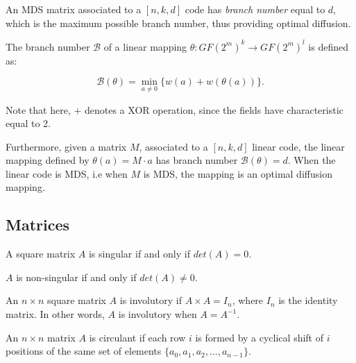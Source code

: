An MDS matrix associated to a $[n, k, d]$ code has \emph{branch number} equal to $d$, which is the maximum possible branch number, thus providing optimal diffusion.

\begin{definition}\label{def:branch-number}
The branch number $\mathcal{B}$ of a linear mapping $\theta: GF(2^m)^k \rightarrow GF(2^m)^l$ is defined as:

$$\mathcal{B}(\theta) = \min_{a\neq0}\{w(a) + w(\theta(a))\}.$$

Note that here, $+$ denotes a XOR operation, since the fields have characteristic equal to 2.

Furthermore, given a matrix $M$, associated to a $[n, k, d]$ linear code, the linear mapping defined by $\theta(a) = M \cdot a$ has branch number $\mathcal{B}(\theta) = d$. When the linear code is MDS, i.e when $M$ is MDS, the mapping is an optimal diffusion mapping.
\end{definition}

\subsection{Matrices}


\begin{definition}
A square matrix $A$ is singular if and only if $det(A) = 0$.
\end{definition}

\begin{definition}
$A$ is non-singular if and only if $det(A) \neq 0$.
\end{definition}

\begin{definition}
An $n \times n$ square matrix $A$ is involutory if $A \times A = I_n$, where $I_n$ is the identity matrix. In other words, $A$ is involutory when $A = A^{-1}$.
\end{definition}

\begin{definition}
An $n \times n$ matrix $A$ is circulant if each row $i$ is formed by a cyclical shift of $i$ positions of the same set of elements $\{a_0, a_1, a_2, ..., a_{n-1}\}$.
\end{definition}

